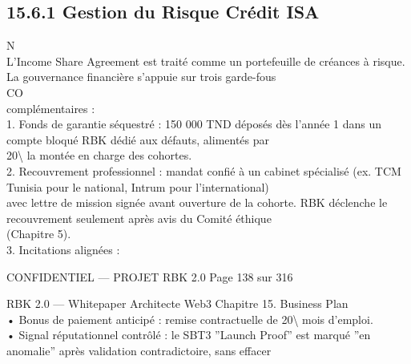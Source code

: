 \documentclass[12pt,landscape,a4paper]{article}
\newenvironment{confidential}
{\begin{tcolorbox}[
    colback=rbkred!5!white,
    colframe=rbkred!75!black,
    title=CONFIDENTIEL,
    fonttitle=\bfseries\color{white},
    coltitle=rbkred!75!black,
    breakable,
    enhanced,
    frame hidden,
    borderline west={2pt}{0pt}{rbkred!75!black}
]}
{\end{tcolorbox}}
\begin{document}
\subsection{15.6.1 Gestion du Risque Crédit ISA}
\vspace{0.5em}
N\\
L’Income Share Agreement est traité comme un portefeuille de créances à risque. La gouvernance financière s’appuie sur trois garde-fous\\
CO\\
complémentaires :\\
\vspace{0.5em}
1. Fonds de garantie séquestré : 150 000 TND déposés dès l’année 1 dans un compte bloqué RBK dédié aux défauts, alimentés par\\
20\textbackslash{}%
la montée en charge des cohortes.\\
\vspace{0.5em}
2. Recouvrement professionnel : mandat confié à un cabinet spécialisé (ex. TCM Tunisia pour le national, Intrum pour l’international)\\
avec lettre de mission signée avant ouverture de la cohorte. RBK déclenche le recouvrement seulement après avis du Comité éthique\\
(Chapitre 5).\\
\vspace{0.5em}
3. Incitations alignées :\\
\vspace{0.5em}
\vspace{0.5em}
\begin{confidential}CONFIDENTIEL — PROJET RBK 2.0                                   Page 138 sur 316\end{confidential}
RBK 2.0 — Whitepaper Architecte Web3                                                                                               Chapitre 15. Business Plan\\
\vspace{0.5em}
\vspace{0.5em}
• Bonus de paiement anticipé : remise contractuelle de 20\textbackslash{}%
mois d’emploi.\\
• Signal réputationnel contrôlé : le SBT3 ”Launch Proof” est marqué ”en anomalie” après validation contradictoire, sans effacer\\
\end{document}
